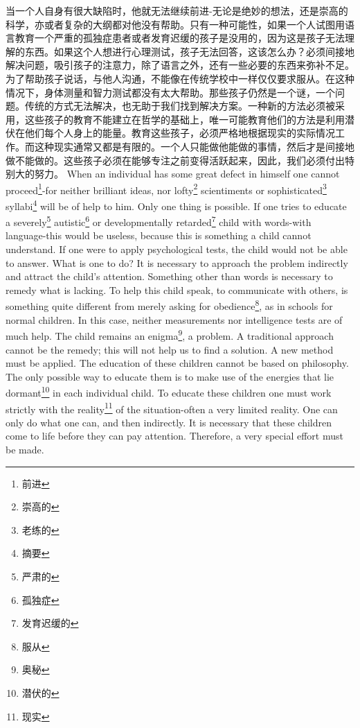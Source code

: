 \documentclass[lang=cn,10pt]{elegantbook}
\begin{document}
\begin{tcolorbox}[title=译文,
colback=red!5!white,
colframe=red!75!black,
fonttitle=\bfseries]
当一个人自身有很大缺陷时，他就无法继续前进-无论是绝妙的想法，还是崇高的科学，亦或者复杂的大纲都对他没有帮助。只有一种可能性，如果一个人试图用语言教育一个严重的孤独症患者或者发育迟缓的孩子是没用的，因为这是孩子无法理解的东西。如果这个人想进行心理测试，孩子无法回答，这该怎么办？必须间接地解决问题，吸引孩子的注意力，除了语言之外，还有一些必要的东西来弥补不足。为了帮助孩子说话，与他人沟通，不能像在传统学校中一样仅仅要求服从。在这种情况下，身体测量和智力测试都没有太大帮助。那些孩子仍然是一个谜，一个问题。传统的方式无法解决，也无助于我们找到解决方案。一种新的方法必须被采用，这些孩子的教育不能建立在哲学的基础上，唯一可能教育他们的方法是利用潜伏在他们每个人身上的能量。教育这些孩子，必须严格地根据现实的实际情况工作。而这种现实通常又都是有限的。一个人只能做他能做的事情，然后才是间接地做不能做的。这些孩子必须在能够专注之前变得活跃起来，因此，我们必须付出特别大的努力。
When an individual has some great defect in himself one cannot proceed\footnote{前进}-for neither brilliant ideas, nor lofty\footnote{崇高的} scientiments or sophisticated\footnote{老练的} syllabi\footnote{摘要} will be of help to him. Only one thing is possible. If one tries to educate a severely\footnote{严肃的} autistic\footnote{孤独症} or developmentally retarded\footnote{发育迟缓的} child with words-with language-this would be useless, because this is something a child cannot understand. If one were to apply psychological tests, the child would not be able to answer. What is one to do? It is necessary to approach the problem indirectly and attract the child's attention. Something other than words is necessary to remedy what is lacking. To help this child speak, to communicate with others, is something quite different from merely asking for obedience\footnote{服从}, as in schools for normal children. In this case, neither measurements nor intelligence tests are of much help. The child remains an enigma\footnote{奥秘}, a problem. A traditional approach cannot be the remedy; this will not help us to find a solution. A new method must be applied. The education of these children cannot be based on philosophy. The only possible way to educate them is to make use of the energies that lie dormant\footnote{潜伏的} in each individual child. To educate these children one must work strictly with the reality\footnote{现实} of the situation-often a very limited reality. One can only do what one can, and then indirectly. It is necessary that these children come to life before they can pay attention. Therefore, a very special effort must be made.
\end{tcolorbox}
\end{document}
